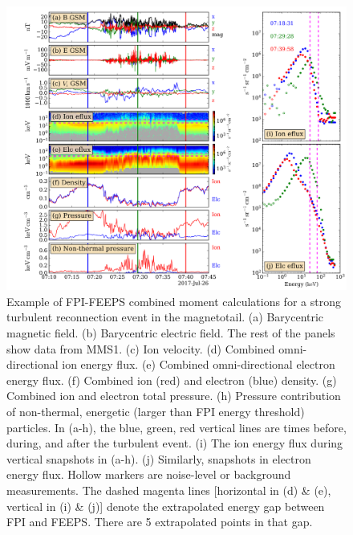 \documentclass[draft]{agujournal2019}
\begin{document}
\begin{figure}
\centering
\noindent\includegraphics[width=\textwidth]{2023JA031358R-f01.pdf}
\caption{
    Example of FPI-FEEPS combined moment calculations for a strong turbulent reconnection event in the magnetotail. (a) Barycentric magnetic field. (b) Barycentric electric field. The rest of the panels show data from MMS1. (c) Ion velocity. (d) Combined omni-directional ion energy flux. (e) Combined omni-directional electron energy flux. (f) Combined ion (red) and electron (blue) density. (g) Combined ion and electron total pressure. (h) Pressure contribution of non-thermal, energetic (larger than FPI energy threshold) particles. In (a-h), the blue, green, red vertical lines are times before, during, and after the turbulent event. (i) The ion energy flux during vertical snapshots in (a-h). (j) Similarly, snapshots in electron energy flux. Hollow markers are noise-level or background measurements. The dashed magenta lines [horizontal in (d) \& (e), vertical in (i) \& (j)] denote the extrapolated energy gap between FPI and FEEPS. There are 5 extrapolated points in that gap.
}
\label{fig:fpi_feeps_combination_example}
\end{figure}
\end{document}
